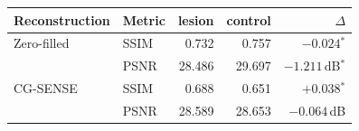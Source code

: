 \begin{tabular}{llrrr}
\toprule
Reconstruction & Metric & lesion & control & $\Delta$ \\
\midrule
Zero-filled & SSIM & 0.732 & 0.757 & $-0.024$$^{*}$ \\
 & PSNR & 28.486 & 29.697 & $-1.211$\,dB$^{*}$ \\
CG-SENSE & SSIM & 0.688 & 0.651 & $+0.038$$^{*}$ \\
 & PSNR & 28.589 & 28.653 & $-0.064$\,dB \\
\bottomrule
\end{tabular}